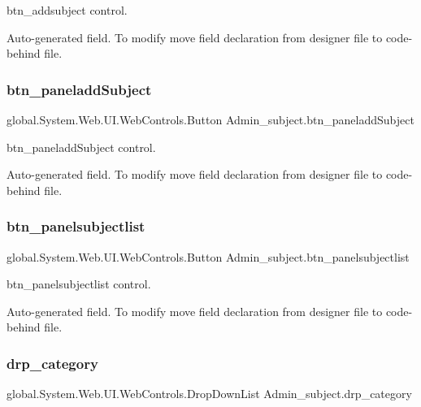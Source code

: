 btn\+\_\+addsubject control. 

Auto-\/generated field. To modify move field declaration from designer file to code-\/behind file. \mbox{\label{class_admin__subject_a55c98b2b2092c03b9a8a4941f8c69f8c}} 
\subsubsection{\texorpdfstring{btn\_paneladdSubject}{btn\_paneladdSubject}}
{\footnotesize\ttfamily global.\+System.\+Web.\+U\+I.\+Web\+Controls.\+Button Admin\+\_\+subject.\+btn\+\_\+paneladd\+Subject\hspace{0.3cm}{\ttfamily [protected]}}



btn\+\_\+paneladd\+Subject control. 

Auto-\/generated field. To modify move field declaration from designer file to code-\/behind file. \mbox{\label{class_admin__subject_ad60e504f3d14c5f6f97aed964386d82a}} 
\subsubsection{\texorpdfstring{btn\_panelsubjectlist}{btn\_panelsubjectlist}}
{\footnotesize\ttfamily global.\+System.\+Web.\+U\+I.\+Web\+Controls.\+Button Admin\+\_\+subject.\+btn\+\_\+panelsubjectlist\hspace{0.3cm}{\ttfamily [protected]}}



btn\+\_\+panelsubjectlist control. 

Auto-\/generated field. To modify move field declaration from designer file to code-\/behind file. \mbox{\label{class_admin__subject_a75a8debb20d63be717759cd5bcbf2711}} 
\subsubsection{\texorpdfstring{drp\_category}{drp\_category}}
{\footnotesize\ttfamily global.\+System.\+Web.\+U\+I.\+Web\+Controls.\+Drop\+Down\+List Admin\+\_\+subject.\+drp\+\_\+category\hspace{0.3cm}{\ttfamily [protected]}}



